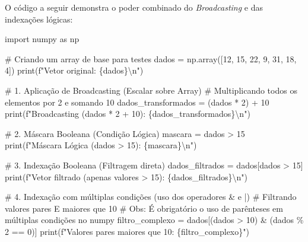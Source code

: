\documentclass[
  brazilian,
  letterpaper,
  DIV=11,
  numbers=noendperiod]{scrreprt}
\newenvironment{Shaded}{\begin{snugshade}}{\end{snugshade}}
\newcommand{\BuiltInTok}[1]{\textcolor[rgb]{0.00,0.23,0.31}{#1}}
\newcommand{\CharTok}[1]{\textcolor[rgb]{0.13,0.47,0.30}{#1}}
\newcommand{\CommentTok}[1]{\textcolor[rgb]{0.37,0.37,0.37}{#1}}
\newcommand{\DecValTok}[1]{\textcolor[rgb]{0.68,0.00,0.00}{#1}}
\newcommand{\ImportTok}[1]{\textcolor[rgb]{0.00,0.46,0.62}{#1}}
\newcommand{\NormalTok}[1]{\textcolor[rgb]{0.00,0.23,0.31}{#1}}
\newcommand{\OperatorTok}[1]{\textcolor[rgb]{0.37,0.37,0.37}{#1}}
\newcommand{\SpecialCharTok}[1]{\textcolor[rgb]{0.37,0.37,0.37}{#1}}
\newcommand{\SpecialStringTok}[1]{\textcolor[rgb]{0.13,0.47,0.30}{#1}}
\begin{document}
O código a seguir demonstra o poder combinado do \emph{Broadcasting} e
das indexações lógicas:

\begin{Shaded}
\begin{Highlighting}[]
\ImportTok{import}\NormalTok{ numpy }\ImportTok{as}\NormalTok{ np}

\CommentTok{\# Criando um array de base para testes}
\NormalTok{dados }\OperatorTok{=}\NormalTok{ np.array([}\DecValTok{12}\NormalTok{, }\DecValTok{15}\NormalTok{, }\DecValTok{22}\NormalTok{, }\DecValTok{9}\NormalTok{, }\DecValTok{31}\NormalTok{, }\DecValTok{18}\NormalTok{, }\DecValTok{4}\NormalTok{])}
\BuiltInTok{print}\NormalTok{(}\SpecialStringTok{f"Vetor original: }\SpecialCharTok{\{}\NormalTok{dados}\SpecialCharTok{\}}\CharTok{\textbackslash{}n}\SpecialStringTok{"}\NormalTok{)}

\CommentTok{\# 1. Aplicação de Broadcasting (Escalar sobre Array)}
\CommentTok{\# Multiplicando todos os elementos por 2 e somando 10}
\NormalTok{dados\_transformados }\OperatorTok{=}\NormalTok{ (dados }\OperatorTok{*} \DecValTok{2}\NormalTok{) }\OperatorTok{+} \DecValTok{10}
\BuiltInTok{print}\NormalTok{(}\SpecialStringTok{f"Broadcasting (dados * 2 + 10): }\SpecialCharTok{\{}\NormalTok{dados\_transformados}\SpecialCharTok{\}}\CharTok{\textbackslash{}n}\SpecialStringTok{"}\NormalTok{)}

\CommentTok{\# 2. Máscara Booleana (Condição Lógica)}
\NormalTok{mascara }\OperatorTok{=}\NormalTok{ dados }\OperatorTok{\textgreater{}} \DecValTok{15}
\BuiltInTok{print}\NormalTok{(}\SpecialStringTok{f"Máscara Lógica (dados \textgreater{} 15): }\SpecialCharTok{\{}\NormalTok{mascara}\SpecialCharTok{\}}\CharTok{\textbackslash{}n}\SpecialStringTok{"}\NormalTok{)}

\CommentTok{\# 3. Indexação Booleana (Filtragem direta)}
\NormalTok{dados\_filtrados }\OperatorTok{=}\NormalTok{ dados[dados }\OperatorTok{\textgreater{}} \DecValTok{15}\NormalTok{]}
\BuiltInTok{print}\NormalTok{(}\SpecialStringTok{f"Vetor filtrado (apenas valores \textgreater{} 15): }\SpecialCharTok{\{}\NormalTok{dados\_filtrados}\SpecialCharTok{\}}\CharTok{\textbackslash{}n}\SpecialStringTok{"}\NormalTok{)}

\CommentTok{\# 4. Indexação com múltiplas condições (uso dos operadores \& e |)}
\CommentTok{\# Filtrando valores pares E maiores que 10}
\CommentTok{\# Obs: É obrigatório o uso de parênteses em múltiplas condições no numpy}
\NormalTok{filtro\_complexo }\OperatorTok{=}\NormalTok{ dados[(dados }\OperatorTok{\textgreater{}} \DecValTok{10}\NormalTok{) }\OperatorTok{\&}\NormalTok{ (dados }\OperatorTok{\%} \DecValTok{2} \OperatorTok{==} \DecValTok{0}\NormalTok{)]}
\BuiltInTok{print}\NormalTok{(}\SpecialStringTok{f"Valores pares maiores que 10: }\SpecialCharTok{\{}\NormalTok{filtro\_complexo}\SpecialCharTok{\}}\SpecialStringTok{"}\NormalTok{)}
\end{Highlighting}
\end{Shaded}
\end{document}
